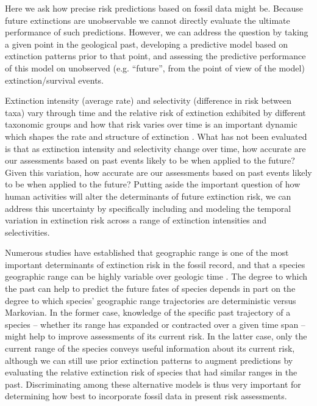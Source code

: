 \documentclass[12pt,letterpaper]{article}
\begin{document}
\begin{refsection}
Here we ask how precise risk predictions based on fossil data might be. Because future extinctions are unobservable we cannot directly evaluate the ultimate performance of such predictions. However, we can address the question by taking a given point in the geological past, developing a predictive model based on extinction patterns prior to that point, and assessing the predictive performance of this model on unobserved (e.g. ``future'', from the point of view of the model) extinction/survival events.

Extinction intensity (average rate) and selectivity (difference in risk between taxa) vary through time and the relative risk of extinction exhibited by different taxonomic groups and how that risk varies over time is an important dynamic which shapes the rate and structure of extinction \citep{Payne2007,Payne2016,Ezard2011,Smits2019}. What has not been evaluated is that as extinction intensity and selectivity change over time, how accurate are our assessments based on past events likely to be when applied to the future? Given this variation, how accurate are our assessments based on past events likely to be when applied to the future? Putting aside the important question of how human activities will alter the determinants of future extinction risk, we can address this uncertainty by specifically including and modeling the temporal variation in extinction risk across a range of extinction intensities and selectivities.

Numerous studies have established that geographic range is one of the most important determinants of extinction risk in the fossil record, and that a species geographic range can be highly variable over geologic time \citep{Foote2007,Liow2010,Liow2007,Kiessling2013,Payne2007,Jablonski2003,Jablonski2008,Jablonski2006}. The degree to which the past can help to predict the future fates of species depends in part on the degree to which species’ geographic range trajectories are deterministic versus Markovian. In the former case, knowledge of the specific past trajectory of a species -- whether its range has expanded or contracted over a given time span -- might help to improve assessments of its current risk. In the latter case, only the current range of the species conveys useful information about its current risk, although we can still use prior extinction patterns to augment predictions by evaluating the relative extinction risk of species that had similar ranges in the past. Discriminating among these alternative models is thus very important for determining how best to incorporate fossil data in present risk assessments.


\end{refsection}
\end{document}
